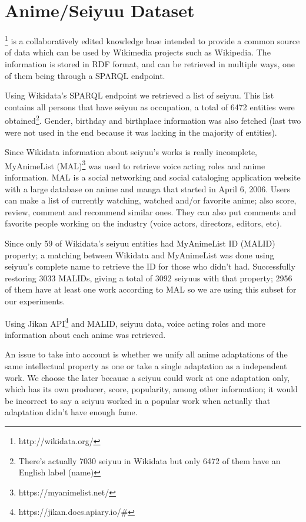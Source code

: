 \section{Anime/Seiyuu Dataset}

\footnote{http://wikidata.org/} is a collaboratively edited knowledge base intended to provide a common source of data which can be used by Wikimedia projects such as Wikipedia. The information is stored in RDF format, and can be retrieved in multiple ways, one of them being through a SPARQL endpoint.

Using Wikidata's SPARQL endpoint we retrieved a list of seiyuu. This list contains all persons that have seiyuu as occupation, a total of 6472 entities were obtained\footnote{There's actually 7030 seiyuu in Wikidata but only 6472 of them have an English label (name)}. Gender, birthday and birthplace information was also fetched (last two were not used in the end because it was lacking in the majority of entities).

Since Wikidata information about seiyuu's works is really incomplete, MyAnimeList (MAL)\footnote{https://myanimelist.net/} was used to retrieve voice acting roles and anime information. MAL is a social networking and social cataloging application website with a large database on anime and manga that started in April 6, 2006. Users can make a list of currently watching, watched and/or favorite anime; also score, review, comment and recommend similar ones. They can also put comments and favorite people working on the industry (voice actors, directors, editors, etc).

Since only 59 of Wikidata's seiyuu entities had MyAnimeList ID (MALID) property; a matching between Wikidata and MyAnimeList was done using seiyuu's complete name to retrieve the ID for those who didn’t had. Successfully restoring 3033 MALIDs, giving a total of 3092 seiyuus with that property; 2956 of them have at least one work according to MAL so we are using this subset for our experiments.

Using Jikan API\footnote{https://jikan.docs.apiary.io/\#} and MALID, seiyuu data, voice acting roles and more information about each anime was retrieved. 

An issue to take into account is whether we unify all anime adaptations of the same intellectual property as one or take a single adaptation as a independent work. We choose the later because a seiyuu could work at one adaptation only, which has its own producer, score, popularity, among other information; it would be incorrect to say a seiyuu worked in a popular work when actually that adaptation didn’t have enough fame.

